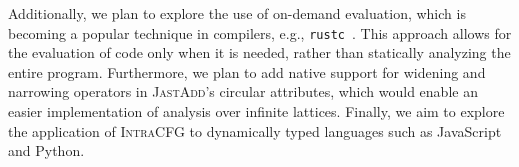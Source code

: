 Additionally, we plan to explore the use of on-demand evaluation, which is becoming a popular 
technique in compilers, e.g., \texttt{rustc}~\cite{Rust_Query_Guide}. This approach allows for the 
evaluation of code only when it is needed, rather than statically analyzing the 
entire program. Furthermore, we plan to add native support for widening and narrowing 
operators in \textsc{JastAdd}'s circular attributes, which would enable an easier implementation
of analysis over infinite lattices. Finally, we aim to explore the application of \textsc{IntraCFG} to 
dynamically typed languages such as JavaScript and Python.